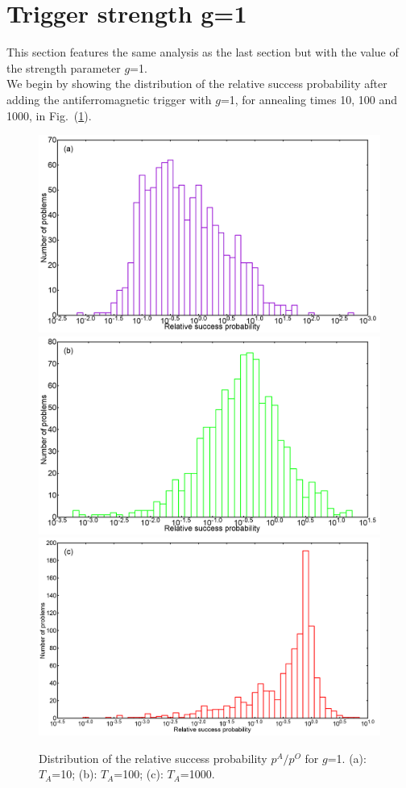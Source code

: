 \documentclass[../main.tex]{subfiles}
\begin{document}
\section{Trigger strength g=1}
This section features the same analysis as the last section but with the value of the strength parameter $g$=1.\\
We begin by showing the distribution of the relative success probability after adding the antiferromagnetic trigger with $g$=1, for annealing times 10, 100 and 1000, in Fig.~(\ref{fig:a18}).
\begin{figure}
\centering 
\includegraphics[scale=0.24]{A_T10_g1.png}
\includegraphics[scale=0.24]{A_T100_g1.png}
\includegraphics[scale=0.24]{A_T1000_g1.png}
\caption{Distribution of the relative success probability $p^A/p^O$ for $g$=1. (a): $T_A$=10; (b): $T_A$=100; (c): $T_A$=1000.}
\label{fig:a18}
\end{figure}
\end{document}
